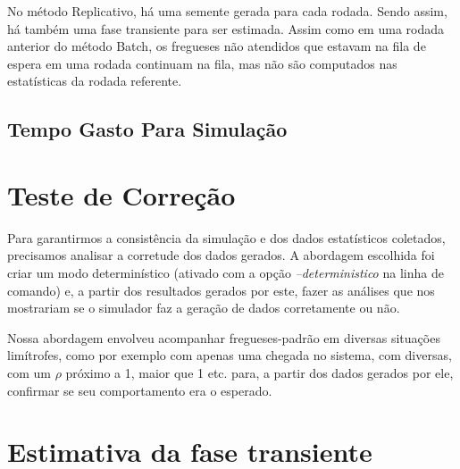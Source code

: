 \documentclass[a4paper,10pt]{article}
\begin{document}
    No método Replicativo, há uma semente gerada para cada rodada. Sendo assim, há também uma fase transiente para ser estimada. Assim como em uma rodada anterior do método Batch, os fregueses não atendidos que estavam na fila de espera em uma rodada continuam na fila, mas não são computados nas estatísticas da rodada referente.


\subsection{Tempo Gasto Para Simulação}

\pagebreak

\section{Teste de Correção}

    Para garantirmos a consistência da simulação e dos dados estatísticos coletados, precisamos analisar a corretude dos dados gerados. A abordagem escolhida foi criar um modo determinístico (ativado com a opção \emph{--deterministico} na linha de comando) e, a partir dos resultados gerados por este, fazer as análises que nos mostrariam se o simulador faz a geração de dados corretamente ou não.

    Nossa abordagem envolveu acompanhar fregueses-padrão em diversas situações limítrofes, como por exemplo com apenas uma chegada no sistema, com diversas, com um $\rho$ próximo a 1, maior que 1 etc. para, a partir dos dados gerados por ele, confirmar se seu comportamento era o esperado.

    


\pagebreak

\section{Estimativa da fase transiente}
\end{document}
